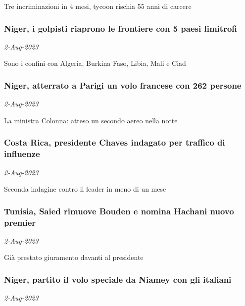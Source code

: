 Tre incriminazioni in 4 mesi, tycoon rischia 55 anni di carcere
\subsubsection{Niger, i golpisti riaprono le frontiere con 5 paesi limitrofi \href{https://www.ansa.it/sito/notizie/mondo/africa/2023/08/02/niger-i-golpisti-riaprono-le-frontiere-con-5-paesi-limitrofi_5e3f6753-8441-45b6-9324-94c188eaca5e.html}{}}
\textit{2-Aug-2023}

Sono i confini con Algeria, Burkina Faso, Libia, Mali e Ciad
\subsubsection{Niger, atterrato a Parigi un volo francese con 262 persone \href{https://www.ansa.it/sito/notizie/mondo/europa/2023/08/02/niger-atterrato-a-parigi-un-volo-francese-con-262-persone_75b3cce5-26fd-4258-bcd2-3164fabe0747.html}{}}
\textit{2-Aug-2023}

La ministra Colonna: atteso un secondo aereo nella notte
\subsubsection{Costa Rica, presidente Chaves indagato per traffico di influenze \href{https://www.ansa.it/sito/notizie/mondo/americalatina/2023/08/02/costa-rica-presidente-chaves-indagato-per-traffico-di-influenze_6e762fe2-34f8-45f6-8405-4e2bbee7e4aa.html}{}}
\textit{2-Aug-2023}

Seconda indagine contro il leader in meno di un mese
\subsubsection{Tunisia, Saied rimuove Bouden e nomina Hachani nuovo premier \href{https://www.ansa.it/sito/notizie/mondo/africa/2023/08/02/tunisia-saied-rimuove-bouden-e-nomina-hachani-nuovo-premier_6e0c49aa-2f64-48c4-94be-7a2a8d32377d.html}{}}
\textit{2-Aug-2023}

Gi\`{a} prestato giuramento davanti al presidente
\subsubsection{Niger, partito il volo speciale da Niamey con gli italiani \href{https://www.ansa.it/sito/notizie/mondo/africa/2023/08/02/niger-partito-il-volo-speciale-da-niamey-con-gli-italiani_13257daf-be8a-46f7-882c-5904e50cdfbf.html}{}}
\textit{2-Aug-2023}

